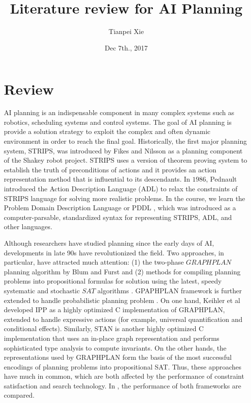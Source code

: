 \documentclass[11pt]{article}
\begin{document}
\title{Literature review for AI Planning}
\date{Dec 7th., 2017 }
\author{Tianpei Xie}
\maketitle
\section{Review}
AI planning is an indispensable component in many complex systems such as robotics, scheduling systems and control systems. The goal of AI planning is provide a solution strategy to exploit the complex and often dynamic environment in order to reach the final goal.  Historically, the first major planning system, STRIPS, was introduced by Fikes and Nilsson \cite{fikes1971strips} as a planning component of the Shakey robot project.  STRIPS uses a version of theorem proving system to establish the truth of preconditions of actions and it provides an action representation method that is influential to its descendants.  In $1986$, Pednault introduced the Action Description Language (ADL) to relax the constraints of STRIPS language for solving more realistic problems. In the course, we learn the Problem Domain Description
Language or PDDL \cite{mcdermott1998pddl}, which was introduced as a computer-parsable, standardized syntax for representing STRIPS, ADL, and other languages. 

Although researchers have studied planning since the early days of AI,  developments in late 90s have revolutionized the
field. Two approaches, in particular, have attracted much attention: (1) the two-phase ${GRAPHPLAN}$ planning algorithm by Blum and Furst \cite{blum1997fast} and (2) methods for compiling planning problems into propositional formulas for
solution using the latest, speedy systematic and stochastic $SAT$ algorithms \cite{bayardo1997using, hoos1999towards, hoos1999run}. GPAPHPLAN framework is further extended to handle probabilistic planning  problem \cite{blum1999probabilistic}.  On one hand,  Keihler et al \cite{koehler1998planning} developed IPP  as a highly optimized C implementation of GRAPHPLAN, extended to handle expressive actions (for example, universal
quantification and conditional effects). Similarly,  STAN \cite{long1999efficient} is another highly optimized C implementation that uses an in-place graph representation and performs sophisticated type analysis to compute invariants. On the other hands, the representations used by GRAPHPLAN form the basis of the most successful
encodings of planning problems into propositional SAT.  Thus, these approaches have much in common, which are both affected by the performance of constraint satisfaction and search technology. In \cite{weld1999recent}, the performance of both frameworks are compared. 
\end{document}

